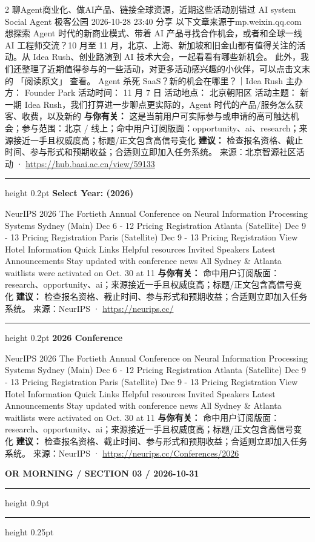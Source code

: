 \documentclass[10.5pt]{ctexart}
\begin{document}
\begin{multicols}{2}
聊Agent商业化、做AI产品、链接全球资源，近期这些活动别错过 AI system Social Agent 极客公园 2026-10-28 23:40 分享 以下文章来源于mp.weixin.qq.com 想探索 Agent 时代的新商业模式、带着 AI 产品寻找合作机会，或者和全球一线 AI 工程师交流？10 月至 11 月，北京、上海、新加坡和旧金山都有值得关注的活 动。从 Idea Rush、创业路演到 AI 技术大会，一起看看有哪些新机会。 此外，我们还整理了近期值得参与的一些活动，对更多活动感兴趣的小伙伴，可以点击文末的 「阅读原文」 查看。 Agent 杀死 SaaS？新的机会在哪里？｜Idea Rush 主办方： Founder Park 活动时间： 11 月 7 日 活动地点： 北京朝阳区 活动主题： 新一期 Idea Rush，我们打算进一步聊点更实际的，Agent 时代的产品/服务怎么获客、收费，以及新的
\textbf{与你有关：} 这是当前用户可实际参与或申请的高可触达机会；参与范围：北京 / 线上；命中用户订阅版面：opportunity、ai、research；来源接近一手且权威度高；标题/正文包含高信号变化
\textbf{建议：} 检查报名资格、截止时间、参与形式和预期收益；合适则立即加入任务系统。
{\footnotesize\color{ormuted} 来源：北京智源社区活动 · \url{https://hub.baai.ac.cn/view/59133}}
\vspace{2mm}
\hrule height 0.2pt
\vspace{2mm}
{\large\bfseries Select Year: (2026)}\par
NeurIPS 2026 The Fortieth Annual Conference on Neural Information Processing Systems Sydney (Main) Dec 6 - 12 Pricing Registration Atlanta (Satellite) Dec 9 - 13 Pricing Registration Paris (Satellite) Dec 9 - 13 Pricing Registration View Hotel Information Quick Links Helpful resources Invited Speakers Latest Announcements Stay updated with conference news All Sydney \& Atlanta waitlists were activated on Oct. 30 at 11
\textbf{与你有关：} 命中用户订阅版面：research、opportunity、ai；来源接近一手且权威度高；标题/正文包含高信号变化
\textbf{建议：} 检查报名资格、截止时间、参与形式和预期收益；合适则立即加入任务系统。
{\footnotesize\color{ormuted} 来源：NeurIPS · \url{https://neurips.cc/}}
\vspace{2mm}
\hrule height 0.2pt
\vspace{2mm}
{\large\bfseries 2026 Conference}\par
NeurIPS 2026 The Fortieth Annual Conference on Neural Information Processing Systems Sydney (Main) Dec 6 - 12 Pricing Registration Atlanta (Satellite) Dec 9 - 13 Pricing Registration Paris (Satellite) Dec 9 - 13 Pricing Registration View Hotel Information Quick Links Helpful resources Invited Speakers Latest Announcements Stay updated with conference news All Sydney \& Atlanta waitlists were activated on Oct. 30 at 11
\textbf{与你有关：} 命中用户订阅版面：research、opportunity、ai；来源接近一手且权威度高；标题/正文包含高信号变化
\textbf{建议：} 检查报名资格、截止时间、参与形式和预期收益；合适则立即加入任务系统。
{\footnotesize\color{ormuted} 来源：NeurIPS · \url{https://neurips.cc/Conferences/2026}}
\end{multicols}
\newpage
{\small\bfseries OR MORNING / SECTION 03 / 2026-10-31}
\vspace{2mm}
\hrule height 0.9pt
\vspace{1.5mm}
\hrule height 0.25pt
\vspace{4mm}
\end{document}
